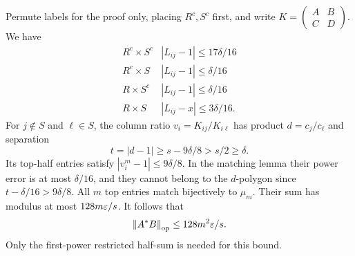 Permute labels for the proof only, placing $R^c,S^c$ first, and write $K=\begin{pmatrix}A&B\\C&D\end{pmatrix}$. We have
\begin{equation}\label{eq:coarserectangle}
 \begin{array}{c|c}
 R^c\times S^c&|L_{ij}-1|\le17\delta/16\\
 R^c\times S&|L_{ij}-1|\le\delta/16\\
 R\times S^c&|L_{ij}-1|\le\delta/16\\
 R\times S&|L_{ij}-x|\le3\delta/16.
 \end{array}
\end{equation}
For $j\notin S$ and $\ell\in S$, the column ratio $v_i=K_{ij}/K_{i\ell}$ has product $d=c_j/c_\ell$ and separation
\[
 t=|d-1|\ge s-9\delta/8>s/2\ge\delta.
\]
Its top-half entries satisfy $|v_i^m-1|\le9\delta/8$. In the matching lemma their power error is at most $\delta/16$, and they cannot belong to the $d$-polygon since $t-\delta/16>9\delta/8$. All $m$ top entries match bijectively to $\mu_m$. Their sum has modulus at most $128m\varepsilon/s$. It follows that
\begin{equation}\label{eq:half-sum}
 \left\lVert A^*B\right\rVert_{\mathrm{op}}\le128m^2\varepsilon/s.
\end{equation}
Only the first-power restricted half-sum is needed for this bound.
